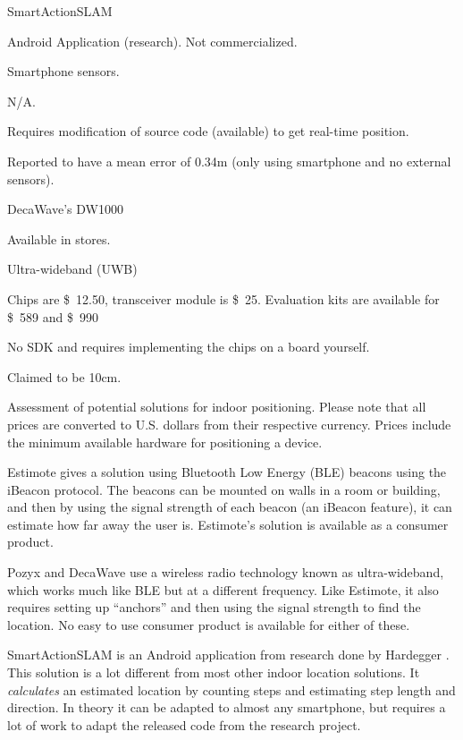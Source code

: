\begin{table}[!htb]
\begin{description}[style=multiline,leftmargin=2.5cm]
        \item[Product:] SmartActionSLAM \cite{SASLAM}
        \item[Availability:] Android Application (research). Not commercialized.
        \item[Technology:] Smartphone sensors.
        \item[Price:] N/A.
        \item[Ease of use:] Requires modification of source code (available) to get real-time position. 
        \item[Accuracy:] Reported to have a mean error of 0.34m (only using smartphone and no external sensors).\\
        
        \item[Product:] DecaWave's DW1000 \cite{decawave}
        \item[Availability:] Available in stores. 
        \item[Technology:] Ultra-wideband (UWB)
        \item[Price:] Chips are \SI{12.50}[\$]{}, transceiver module is \SI{25}[\$]{}. Evaluation kits are available for \SI{589}[\$]{} and \SI{990}[\$]{} 
        \item[Ease of use:] No SDK and requires implementing the chips on a board yourself. 
        \item[Accuracy:] Claimed to be 10cm. 
        \end{description}
    \caption{Assessment of potential solutions for indoor positioning. Please note that all prices are converted to U.S. dollars from their respective currency. Prices include the minimum available hardware for positioning a device.}
    \label{tbl:indoor-positioning}
\end{table}

Estimote gives a solution using Bluetooth Low Energy (BLE) beacons using the iBeacon protocol. 
The beacons can be mounted on walls in a room or building, 
and then by using the signal strength of each beacon (an iBeacon feature), 
it can estimate how far away the user is. 
Estimote's solution is available as a consumer product.

Pozyx and DecaWave use a wireless radio technology known as ultra-wideband, which works much like BLE but at a different frequency. 
Like Estimote, it also requires setting up ``anchors'' and then using the signal strength to find the location. 
No easy to use consumer product is available for either of these.

SmartActionSLAM is an Android application from research done by Hardegger \etal \cite{SASLAM}. 
This solution is a lot different from most other indoor location solutions. 
It \emph{calculates} an estimated location by counting steps and estimating step length and direction. 
In theory it can be adapted to almost any smartphone, 
but requires a lot of work to adapt the released code from the research project. 




